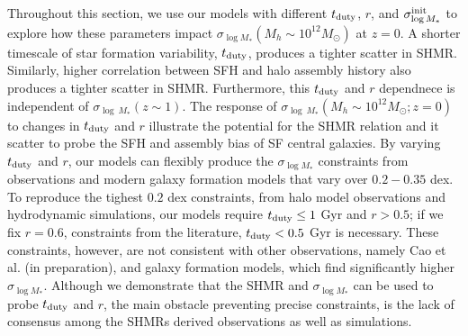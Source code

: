 \documentclass[12pt, letterpaper, preprint, tighten]{aastex62}
\newcommand{\edt}[1]{{\color{dred}{\bf} #1}}
\newcommand{\cao}{Cao et al. (in preparation)}
\newcommand{\tduty}{t_{\rm duty}}
\newcommand{\siglogm}{\sigma_{\log M_*}}
\begin{document}
\edt{Throughout this section, we use our models with different $\tduty$, $r$, and
$\siglogm^{\rm init}$ to explore how these parameters impact 
$\siglogm(M_h\sim10^{12}M_\odot)$ at $z=0$. A shorter timescale of
star formation variability, $\tduty$, produces a tighter scatter in SHMR. Similarly,
higher correlation between SFH and halo assembly history also produces a tighter
scatter in SHMR. Furthermore, this $\tduty$ and $r$ dependnece is independent of
$\sigma_{\log~M_*}(z\sim1)$. The response of $\sigma_{\log~M_*}(M_h\sim10^{12}M_\odot; z=0)$
to changes in $\tduty$ and $r$ illustrate the potential for the SHMR relation
and it scatter to probe the SFH and assembly bias of SF central galaxies. 
By varying $\tduty$ and $r$, our models can flexibly produce the 
$\siglogm$ constraints from observations and modern galaxy formation models
that vary over $0.2 - 0.35$ dex. To reproduce the tighest $0.2$ dex 
constraints, from halo model observations and hydrodynamic simulations, 
our models require $\tduty \leq 1$ Gyr and $r > 0.5$; if we fix $r = 0.6$, 
constraints from the literature, $t_{\rm duty} < 0.5$ Gyr is necessary. 
These constraints, however, are not consistent with other observations,
namely \cao, and galaxy formation models, which find significantly higher 
$\siglogm$. Although we demonstrate that the SHMR and $\siglogm$ can be used to 
probe $\tduty$ and $r$, the main obstacle preventing precise constraints, 
is the lack of consensus among the SHMRs derived observations as well as simulations.
}



\end{document}

